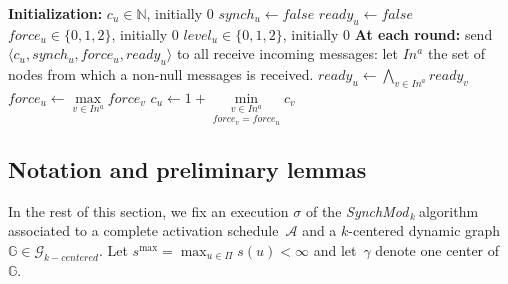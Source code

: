 \documentclass[11pt,letterpaper]{article}
\newcommand{\cent}{\gamma}
\newcommand{\SM}{{\em SynchMod}$_{\,k}\ $}
\begin{document}
\begin{algorithm}[hbt!]
	\DontPrintSemicolon
	\textbf{Initialization:} \;
	\Indp
		$c_u \in \mathds{N}$, initially 0 \;
		$synch_u \leftarrow false$ \;
		$ready_u \leftarrow false$ \;
		$force_u \in \{0, 1, 2\}$, initially 0 \;
		$level_u \in \{0, 1, 2\}$, initially 0 \;
	\BlankLine
	\Indm
	\textbf{At each round:} \;
	\Indp
		send $\langle c_u, synch_u, force_u, ready_u \rangle$ to all  \;
		{\small receive incoming messages: let $In^a$ the set of nodes from which a non-null messages is received.} \;
		$ready_u \leftarrow \underset{v \in In^a}{\bigwedge} ready_v $ \; \label{line:ready-gossip} 
		$force_u \leftarrow \underset{v \in In^a}{\max} force_v$ \;\label{line:force}
		$c_u \leftarrow 1+ \underset{force_v = force_u}{\underset{v \in In^a}{\min}} c_v$ \;\label{line:min-z-end} 
	\Indm
\caption{The \SM algorithm} 
\end{algorithm}

\subsection{Notation and preliminary lemmas}

In the rest of this section, we fix an execution $\sigma$ of the \SM algorithm associated to a complete activation
schedule~$\mathcal{A}$ and a $k$-centered dynamic graph~$\mathds{G} \in \mathcal{G}_{k-centered}$. 
Let $s^{\max} = \max_{u \in \Pi} s(u) < \infty$ and let~$\cent$ denote one center of~$\mathds{G}$.
\end{document}
